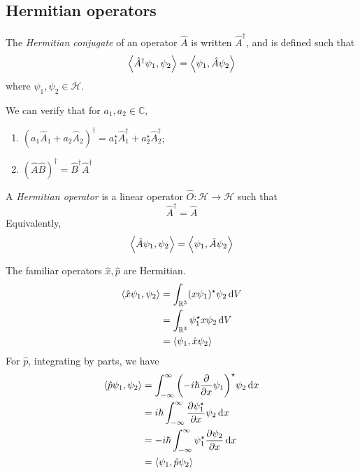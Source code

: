 \subsection{Hermitian operators}
\begin{definition}
	The \textit{Hermitian conjugate} of an operator \( \hat A \) is written \( \hat A^\dagger \), and is defined such that
	\[
		\left\langle{\hat A^\dagger \psi_1, \psi_2}\right\rangle = \left\langle{\psi_1, \hat A \psi_2}\right\rangle
	\]
	where \( \psi_1, \psi_2 \in \mathcal H \).
\end{definition}
\noindent We can verify that for \( a_1, a_2 \in \mathbb C \),
\begin{enumerate}
	\item \( (a_1 \hat A_1 + a_2 \hat A_2 )^\dagger = a_1^\star \hat A_1^\dagger + a_2^\star \hat A_2^\dagger \);
	\item \( (\hat A \hat B)^\dagger = \hat B^\dagger \hat A^\dagger \)
\end{enumerate}
\begin{definition}
	A \textit{Hermitian operator} is a linear operator \( \hat O \colon \mathcal H \to \mathcal H \) such that
	\[
		\hat A^\dagger = \hat A
	\]
	Equivalently,
	\[
		\left\langle{\hat A \psi_1, \psi_2}\right\rangle = \left\langle{\psi_1, \hat A \psi_2}\right\rangle
	\]
\end{definition}
\begin{example}
	The familiar operators \( \hat x, \hat p \) are Hermitian.
	\begin{align*}
		\left\langle{\hat x \psi_1, \psi_2}\right\rangle & = \int_{\mathbb R^3} (x \psi_1)^\star \psi_2 \dd{V} \\
		                              & = \int_{\mathbb R^3} \psi_1^\star x \psi_2 \dd{V}   \\
		                              & = \left\langle{\psi_1, \hat x \psi_2}\right\rangle
	\end{align*}
	For \( \hat p \), integrating by parts, we have
	\begin{align*}
		\left\langle{\hat p \psi_1, \psi_2}\right\rangle & = \int_{-\infty}^\infty \qty(-i\hbar \pdv{x} \psi_1)^\star \psi_2 \dd{x} \\
		                              & = i \hbar \int_{-\infty}^\infty \pdv{\psi_1^\star}{x} \psi_2 \dd{x}      \\
		                              & = -i\hbar \int_{-\infty}^\infty \psi_1^\star \pdv{\psi_2}{x} \dd{x}      \\
		                              & = \left\langle{\psi_1, \hat p \psi_2}\right\rangle
	\end{align*}
\end{example}
